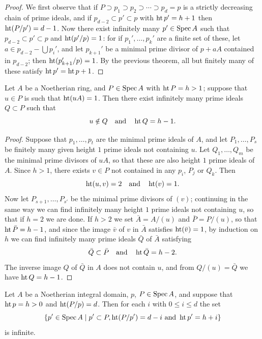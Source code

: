 \begin{proof}
We first observe that if $P \supset p_1 \supset p_2 \supset \cdots \supset p_d = p$ is a strictly
decreasing chain of prime ideals, and if $p_{d-2} \subset p' \subset p$ with
$\operatorname{ht} p' = h + 1$ then $\operatorname{ht}(P/p') = d - 1$. Now there exist infinitely many
$p' \in \operatorname{Spec} A$ such that $p_{d-2} \subset p' \subset p$ and $\operatorname{ht}(p'/p) = 1$: for if
$p_1', \ldots, p_k'$ are a finite set of these, let $a \in p_{d-2} - \bigcup p_i'$, and let
$p_{k+1}'$ be a minimal prime divisor of $p + aA$ contained in $p_{d-2}$; then
$\operatorname{ht}(p_{k+1}'/p) = 1$. By the previous theorem, all but finitely many of these
satisfy $\operatorname{ht} p' = \operatorname{ht} p + 1$.
\end{proof}

\begin{lemma}\label{lem:31.1}
Let $A$ be a Noetherian ring, and $P \in \operatorname{Spec} A$ with $\operatorname{ht} P = h > 1$; suppose that
$u \in P$ is such that $\operatorname{ht}(uA) = 1$. Then there exist infinitely many prime ideals
$Q \subset P$ such that
\[
  u \notin Q \quad \text{and} \quad \operatorname{ht} Q = h - 1.
\]
\end{lemma}

\begin{proof}
Suppose that $p_1, \ldots, p_t$ are the minimal prime ideals of $A$, and let
$P_1, \ldots, P_s$ be finitely many given height $1$ prime ideals not containing $u$.
Let $Q_1, \ldots, Q_m$ be the minimal prime divisors of $uA$, so that these are also
height $1$ prime ideals of $A$. Since $h > 1$, there exists $v \in P$ not contained in
any $p_i$, $P_j$ or $Q_k$. Then
\[
  \operatorname{ht}(u, v) = 2 \quad \text{and} \quad \operatorname{ht}(v) = 1.
\]
Now let $P_{s+1}, \ldots, P_{s'}$ be the minimal prime divisors of $(v)$; continuing in the
same way we can find infinitely many height $1$ prime ideals not containing $u$, so
that if $h = 2$ we are done. If $h > 2$ we set $\bar{A} = A/(u)$ and
$\bar{P} = P/(u)$, so that $\operatorname{ht} \bar{P} = h - 1$, and since the image $\bar{v}$ of $v$ in
$\bar{A}$ satisfies $\operatorname{ht}(\bar{v}) = 1$, by induction on $h$ we can find infinitely many prime
ideals $\bar{Q}$ of $\bar{A}$ satisfying
\[
  \bar{Q} \subset \bar{P} \quad \text{and} \quad \operatorname{ht} \bar{Q} = h - 2.
\]
The inverse image $Q$ of $\bar{Q}$ in $A$ does not contain $u$, and from
$Q/(u) = \bar{Q}$ we have $\operatorname{ht} Q = h - 1$.
\end{proof}

\begin{theorem}\label{thm:31.3}
Let $A$ be a Noetherian integral domain, $p$, $P \in \operatorname{Spec} A$, and suppose that
$\operatorname{ht} p = h > 0$ and $\operatorname{ht}(P/p) = d$. Then for each $i$ with $0 \le i \le d$ the set
\[
  \{p' \in \operatorname{Spec} A \mid p' \subset P, \operatorname{ht}(P/p') = d - i \text{ and } \operatorname{ht} p' = h + i\}
\]
is infinite.
\end{theorem}

